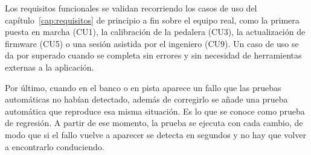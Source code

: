 Los requisitos funcionales se validan recorriendo los casos de uso del capítulo~\ref{cap:requisitos} de principio a fin sobre el equipo real, como la primera puesta en marcha (CU1), la calibración de la pedalera (CU3), la actualización de firmware (CU5) o una sesión asistida por el ingeniero (CU9). Un caso de uso se da por superado cuando se completa sin errores y sin necesidad de herramientas externas a la aplicación.

Por último, cuando en el banco o en pista aparece un fallo que las pruebas automáticas no habían detectado, además de corregirlo se añade una prueba automática que reproduce esa misma situación. Es lo que se conoce como prueba de regresión. A partir de ese momento, la prueba se ejecuta con cada cambio, de modo que si el fallo vuelve a aparecer se detecta en segundos y no hay que volver a encontrarlo conduciendo.
